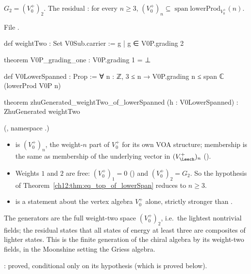 \begin{definition}\label{ch12:def:weightTwo}
$G_2=(V_0^+)_2$.  The residual : for every $n\ge3$,
$(V_0^+)_n\subseteq\operatorname{span}\mathrm{lowerProd}_{V_0^+}(n)$.
\end{definition}
File .
\begin{leancode}
def weightTwo : Set V0Sub.carrier := {g | g ∈ V0P.grading 2}

theorem V0P_grading_one : V0P.grading 1 = ⊥

def V0LowerSpanned : Prop :=
  ∀ n : ℤ, 3 ≤ n → V0P.grading n ≤ span ℂ (lowerProd V0P n)

theorem zhuGenerated_weightTwo_of_lowerSpanned (h : V0LowerSpanned) : ZhuGenerated weightTwo
\end{leancode}
(, namespace .)
\begin{dictionary}
\begin{itemize}
\item {} is $(V_0^+)_n$, the weight-$n$ part of $V_0^+$ for its own VOA structure;
  membership is the same as membership of the underlying vector in $(V_\Leech^+)_n$
  ().
\item Weights $1$ and $2$ are free: $(V_0^+)_1=0$ () and $(V_0^+)_2=G_2$.
  So the hypothesis of Theorem~\ref{ch12:thm:eq_top_of_lowerSpan} reduces to $n\ge3$.
\item {} is a statement about the vertex algebra $V_0^+$ alone, strictly stronger
  than .
\end{itemize}
\end{dictionary}

\begin{physics}
The generators are the full weight-two space $(V_0^+)_2$, i.e.\ the lightest nontrivial fields; the residual  states that all states of energy at least three are composites of lighter states. This is the finite generation of the chiral algebra by its weight-two fields, in the Moonshine setting the Griess algebra.
\end{physics}
\begin{status}: proved, conditional only on its
hypothesis (which is proved below).\end{status}

